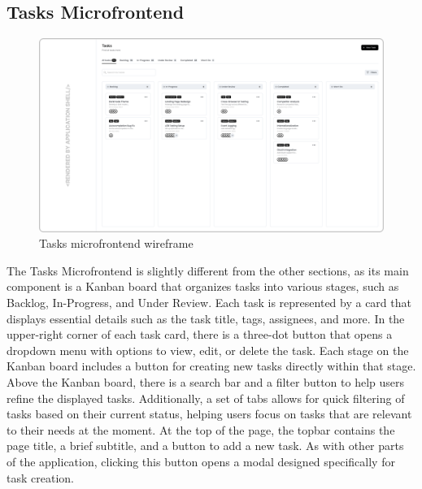 \subsection{Tasks Microfrontend}
\begin{figure}[h]
\centerline{\includegraphics[width=1\textwidth]{images/wireframes/tasks.png}}
\caption[Tasks microfrontend wireframe]{Tasks microfrontend wireframe}
\label{mf:tasks}
\end{figure}
The Tasks Microfrontend is slightly different from the other sections, as its main component is a Kanban board that organizes tasks into various stages, such as Backlog, In-Progress, and Under Review. Each task is represented by a card that displays essential details such as the task title, tags, assignees, and more. In the upper-right corner of each task card, there is a three-dot button that opens a dropdown menu with options to view, edit, or delete the task. Each stage on the Kanban board includes a button for creating new tasks directly within that stage. Above the Kanban board, there is a search bar and a filter button to help users refine the displayed tasks. Additionally, a set of tabs allows for quick filtering of tasks based on their current status, helping users focus on tasks that are relevant to their needs at the moment. At the top of the page, the topbar contains the page title, a brief subtitle, and a button to add a new task. As with other parts of the application, clicking this button opens a modal designed specifically for task creation.

